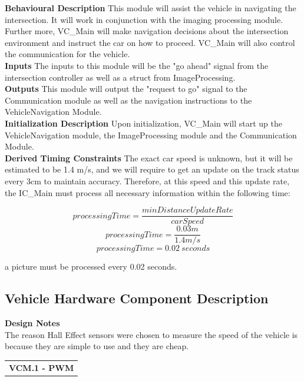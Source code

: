 \documentclass [10pt]{article}
\newcommand{\carSpeed}{1.4 m/s}
\begin{document}
\textbf{Behavioural Description} 
This module will assist the vehicle in navigating the intersection. It will work in conjunction with the imaging processing module. Further more, VC\_Main will make navigation decisions about the intersection environment and instruct the car on how to proceed. VC\_Main will also control the communication for the vehicle. \\

\textbf{Inputs}
The inputs to this module will be the "go ahead" signal from the intersection controller as well as a struct from ImageProcessing. \\ 

\textbf{Outputs}
This module will output the "request to go" signal to the Communication module as well as the navigation instructions to the VehicleNavigation Module. \\

\textbf{Initialization Description}
Upon initialization, VC\_Main will start up the VehicleNavigation module, the ImageProcessing module and the Communication Module. \\

\textbf{Derived Timing Constraints} 
The exact car speed is unknown, but it will be estimated to be \carSpeed, and we will require to get an update on the track status every 3cm to maintain accuracy. Therefore, at this speed and this update rate, the IC\_Main must process all necessary information within the following time:
    
    

    $$ processingTime = \frac{minDistanceUpdateRate}{carSpeed} $$
    $$ processingTime = \frac{0.03m}{\carSpeed} $$
    $$ processingTime = 0.02\ seconds$$
    
a picture must be processed every 0.02 seconds. \\

\subsection{Vehicle Hardware Component Description}

\textbf{Design Notes} \\
The reason Hall Effect sensors were chosen to measure the speed of the vehicle is because they are simple to use and they are cheap. \\

\begin{longtable}{p{}}
\rowcolor{tableCell}\textbf{VCM.1 - PWM} \\
\end{longtable}
\end{document}

